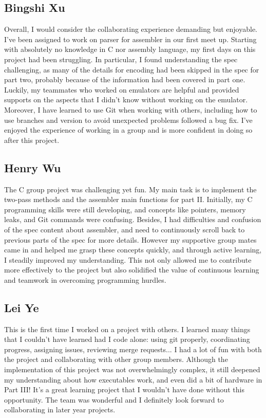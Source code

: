\documentclass[11pt]{article}
\begin{document}
\subsection{Bingshi Xu}
Overall, I would consider the collaborating experience demanding but enjoyable.
I've been assigned to work on parser for assembler in our first meet up.
Starting with absolutely no knowledge in C nor assembly language, my first days
on this project had been struggling. In particular, I found understanding the
spec challenging, as many of the details for encoding had been skipped in the
spec for part two, probably because of the information had been covered in part
one. Luckily, my teammates who worked on emulators are helpful and provided
supports on the aspects that I didn't know without working on the emulator.
Moreover, I have learned to use Git when working with others, including how to
use branches and version to avoid unexpected problems followed a bug fix. I've
enjoyed the experience of working in a group and is more confident in doing so
after this project.

\subsection{Henry Wu}
The C group project was challenging yet fun. My main task is to implement the
two-pass methods and the assembler main functions for part II. Initially, my C
programming skills were still developing, and concepts like pointers, memory
leaks, and Git commands were confusing. Besides, I had difficulties and
confusion of the spec content about assembler, and need to continuously scroll
back to previous parts of the spec for more details. However my supportive
group mates came in and helped me grasp these concepts quickly, and through
active learning, I steadily improved my understanding. This not only allowed me
to contribute more effectively to the project but also solidified the value of
continuous learning and teamwork in overcoming programming hurdles.

\subsection{Lei Ye}

This is the first time I worked on a project with others. I learned many things
that I couldn't have learned had I code alone: using git properly, coordinating
progress, assigning issues, reviewing merge requests... I had a lot of fun with
both the project and collaborating with other group members. Although the
implementation of this project was not overwhelmingly complex, it still
deepened my understanding about how executables work, and even did a bit of
hardware in Part III! It's a great learning project that I wouldn't have done
without this opportunity. The team was wonderful and I definitely look forward
to collaborating in later year projects.
\end{document}

